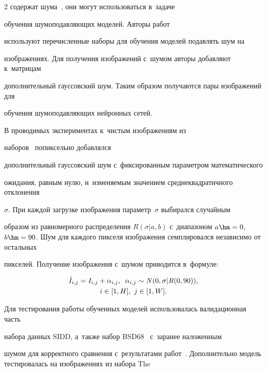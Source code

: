 \begin{multicols}{2}
содержат шума~\cite{FOR_ADD_NOISE_DATASETS}, они могут использоваться в~задаче 


обучения шумоподавляющих моделей. Авторы работ~\cite{MWCNN, MDIWT} 


используют перечисленные наборы для обучения моделей подавлять шум на 


изображениях. Для получения изображений с~шумом авторы до\-бав\-ля\-ют к~мат\-ри\-цам 


дополнительный гауссовский шум. Таким образом получаются пары изображений для 


обучения шумоподавляющих нейронных сетей.





В проводимых экспериментах к~чистым изоб\-ра\-же\-ни\-ям из 


наборов~\cite{FOR_ADD_NOISE_DATASETS, DIV2KDataset} попиксельно до\-бав\-лял\-ся 


дополнительный гауссовский шум с~фиксированным параметром математического 


ожидания, равным нулю, и~изменяемым значением среднеквадратичного отклонения 


$\sigma$. При каждой загрузке изображения параметр~$\sigma$ выбирался случайным 


образом из равномерного распределения $R(\sigma|a, b)$ с~диапазоном $a \hm= 0$, $b \hm= 


90$. Шум для каждого пикселя изображения семплировался независимо от остальных 


пикселей. Получение изображения с~шумом приводится в~формуле:


\begin{multline*}


\tilde{I}_{i,j} = I_{i,j} + \alpha_{i,j},\enskip \alpha_{i,j} \sim \mathit{N}(0, \sigma|\mathit{R}(0, 90)),\\ 


i \in [1, H],\ j \in [1, W].


\end{multline*}





Для тестирования работы обученных моделей использовалась валидационная часть 


набора данных SIDD, а~также набор BSD68~\cite{BSD_set} с~заранее наложенным 


шумом для корректного сравнения с~результатами работ~\cite{MWCNN, MDIWT, WINNet}. Дополнительно модель тестировалась на изображениях из набора The 



\end{multicols}
